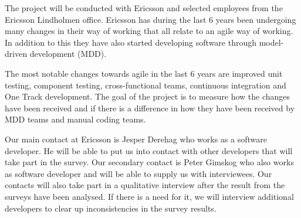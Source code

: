 \documentclass[ProjectPlan_innit.tex]{subfiles}
\begin{document}
The project will be conducted with Ericsson and selected employees from the Ericsson Lindholmen office. Ericsson has during the last 6 years been undergoing many changes in their way of working that all relate to an agile way of working. In addition to this they have also started developing software through model-driven development (MDD). 
\smallskip



The most notable changes towards agile in the last 6 years are improved unit testing\cite{UNIT:ENGELS:2007}, component testing\cite{COMP:GAO:2000}, cross-functional teams\cite{XFT:GHOBADI:2011}, continuous integration\cite{CI:ABDUL:2012} and One Track development\cite{ONETRACK:HRIBAR:2008}. The goal of the project is to measure how the changes have been received and if there is a difference in how they have been received by MDD teams and manual coding teams. 
\smallskip

Our main contact at Ericsson is Jesper Derehag who works as a software developer. He will be able to put us into contact with other developers that will take part in the survey. Our secondary contact is Peter Gimskog who also works as software developer and will be able to supply us with interviewees. Our contacts will also take part in a qualitative interview after the result from the surveys have been analysed. If there is a need for it, we will interview additional developers to clear up inconsistencies in the survey results. 
\end{document}

